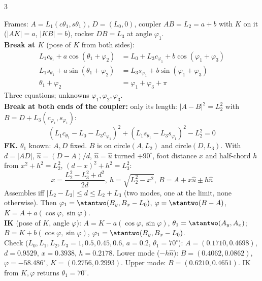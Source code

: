 \begin{multicols}{3}
\begin{fbx}
Frames: $A=L_1(c\theta_1,s\theta_1)$, $D=(L_0,0)$, coupler $AB=L_2=a+b$ with $K$ on it ($|AK|=a$, $|KB|=b$), rocker $DB=L_3$ at angle $\varphi_1$.\\
\textbf{Break at $K$} (pose of $K$ from both sides):
\begin{align*}L_1c_{\theta_1}+a\cos(\theta_1{+}\varphi_2)&=L_0+L_3c_{\varphi_1}+b\cos(\varphi_1{+}\varphi_3)\\ L_1s_{\theta_1}+a\sin(\theta_1{+}\varphi_2)&=L_3s_{\varphi_1}+b\sin(\varphi_1{+}\varphi_3)\\ \theta_1+\varphi_2&=\varphi_1+\varphi_3+\pi\end{align*}
Three equations; unknowns $\varphi_1,\varphi_2,\varphi_3$.\\
\textbf{Break at both ends of the coupler:} only its length: $|A-B|^2=L_2^2$ with $B=D+L_3(c_{\varphi_1},s_{\varphi_1})$:
\[(L_1c_{\theta_1}-L_0-L_3c_{\varphi_1})^2+(L_1s_{\theta_1}-L_3s_{\varphi_1})^2-L_2^2=0\]
\textbf{FK.} $\theta_1$ known: $A,D$ fixed. $B$ is on circle$(A,L_2)$ and circle$(D,L_3)$. With $d=|AD|$, $\hat u=(D-A)/d$, $\hat n=\hat u$ turned $+90^\circ$, foot distance $x$ and half-chord $h$ from $x^2+h^2=L_2^2$, $(d-x)^2+h^2=L_3^2$:
\[x=\frac{L_2^2-L_3^2+d^2}{2d},\ h=\sqrt{L_2^2-x^2},\ B=A+x\hat u\pm h\hat n\]
Assembles iff $|L_2-L_3|\le d\le L_2+L_3$ (two modes, one at the limit, none otherwise). Then $\varphi_1=\atantwo(B_y,B_x-L_0)$, $\varphi=\atantwo(B-A)$, $K=A+a(\cos\varphi,\sin\varphi)$.\\
\textbf{IK} (pose of $K$, angle $\varphi$): $A=K-a(\cos\varphi,\sin\varphi)$, $\theta_1=\atantwo(A_y,A_x)$; $B=K+b(\cos\varphi,\sin\varphi)$, $\varphi_1=\atantwo(B_y,B_x-L_0)$.\\
Check ($L_0,L_1,L_2,L_3=1,0.5,0.45,0.6$, $a=0.2$, $\theta_1=70^\circ$): $A=(0.1710,0.4698)$, $d=0.9529$, $x=0.3938$, $h=0.2178$. Lower mode ($-h\hat n$): $B=(0.4062,0.0862)$, $\varphi=-58.486^\circ$, $K=(0.2756,0.2993)$. Upper mode: $B=(0.6210,0.4651)$. IK from $K,\varphi$ returns $\theta_1=70^\circ$. \chk
\end{fbx}


\end{multicols}
